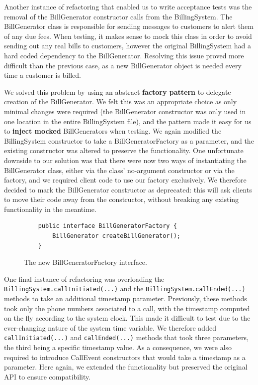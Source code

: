 \documentclass[a4paper]{article}
\begin{document}
Another instance of refactoring that enabled us to write acceptance tests was the removal of the BillGenerator constructor calls from the BillingSystem. The BillGenerator class is responsible for sending messages to customers to alert them of any due fees. When testing, it makes sense to mock this class in order to avoid sending out any real bills to customers, however the original BillingSystem had a hard coded dependency to the BillGenerator. Resolving this issue proved more difficult than the previous case, as a new BillGenerator object is needed every time a customer is billed.

We solved this problem by using an abstract {\bf factory pattern} to delegate creation of the BillGenerator. We felt this was an appropriate choice as only minimal changes were required (the BillGenerator constructor was only used in one location in the entire BillingSystem file), and the pattern made it easy for us to {\bf inject mocked} BillGenerators when testing. We again modified the BillingSystem constructor to take a BillGeneratorFactory as a parameter, and the existing constructor was altered to preserve the functionality. One unfortunate downside to our solution was that there were now two ways of instantiating the BillGenerator class, either via the class’ no-argument constructor or via the factory, and we required client code to use our factory exclusively. We therefore decided to mark the BillGenerator constructor as deprecated: this will ask clients to move their code away from the constructor, without breaking any existing functionality in the meantime.

\begin{figure}[H]
\begin{verbatim}
    public interface BillGeneratorFactory {
        BillGenerator createBillGenerator();
    }
\end{verbatim}
\caption{The new BillGeneratorFactory interface.}
\end{figure}

One final instance of refactoring was overloading the \verb+BillingSystem.callInitiated(...)+ and the \verb+BillingSystem.callEnded(...)+ methods to take an additional timestamp parameter. Previously, these methods took only the phone numbers associated to a call, with the timestamp computed on the fly according to the system clock. This made it difficult to test due to the ever-changing nature of the system time variable. We therefore added \verb+callInitiated(...)+ and \verb+callEnded(...)+ methods that took three parameters, the third being a specific timestamp value. As a consequence, we were also required to introduce CallEvent constructors that would take a timestamp as a parameter. Here again, we extended the functionality but preserved the original API to ensure compatibility.
\end{document}
